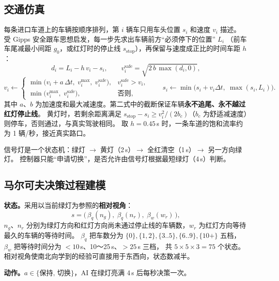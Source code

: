 \documentclass[UTF8,a4paper,zihao=-4,fontset=none]{ctexart}
\begin{document}
\subsection{交通仿真}
每条进口车道上的车辆按顺序排列，第 $i$ 辆车只用车头位置 $s_i$ 和速度 $v_i$ 描述。
受 Gipps 安全跟车思想\cite{gipps1981}启发，每一步先求出车辆前方“必须停下的位置” $L_i$
（前车车尾减最小间距 $g_0$，或红灯时的停止线 $s_{\text{stop}}$），再保留与速度成正比的时间车距 $h$：
\begin{equation}
  d_i = L_i - h\,v_i - s_i,\qquad
  v_i^{\text{safe}} = \sqrt{2\,b\,\max(d_i,0)},
\end{equation}
\begin{equation}
  v_i \leftarrow
  \begin{cases}
    \min\!\big(v_i + a\,\Delta t,\; v_i^{\max},\; v_i^{\text{safe}}\big), & v_i^{\text{safe}} > v_i,\\
    \min\!\big(v_i^{\max},\; v_i^{\text{safe}}\big), & \text{否则},
  \end{cases}
  \qquad s_i \leftarrow \min\!\big(s_i + v_i\Delta t,\; \max(s_i, L_i)\big).
\end{equation}
其中 $a$、$b$ 为加速度和最大减速度。第二式中的截断保证车辆\textbf{永不追尾、永不越过红灯停止线}。
黄灯时，若剩余距离满足 $s_{\text{stop}}-s_i \ge v_i^2/(2b_c)$（$b_c$ 为舒适减速度）则停车，否则通过，与真实驾驶相同。
取 $h=0.45$\,s 时，一条车道的饱和流率约为 1 辆/秒，接近真实路口。

信号灯是一个状态机：绿灯 $\to$ 黄灯（2\,s）$\to$ 全红清空（1\,s）$\to$ 另一方向绿灯。
控制器只能“申请切换”，是否允许由信号灯根据最短绿灯（4\,s）判断。

\subsection{马尔可夫决策过程建模}
\textbf{状态。}采用以当前绿灯为参照的\textbf{相对视角}：
\begin{equation}
  s = \big(\,\beta_q(n_g),\; \beta_q(n_r),\; \beta_w(w_r)\,\big),
\end{equation}
$n_g$、$n_r$ 分别为绿灯方向和红灯方向尚未通过停止线的车辆数，$w_r$ 为红灯方向等待最久的车辆的等待时间。
$\beta_q$ 把车数分为 $\{0\},\{1,2\},\{3..5\},\{6..9\},\{10+\}$ 五档，$\beta_w$ 把等待时间分为 $<10$\,s、10～25\,s、$>25$\,s 三档，
共 $5\times5\times3=75$ 个状态。相对视角使南北向学到的经验可直接用于东西向，状态数减半。

\textbf{动作。}$a\in\{\text{保持},\,\text{切换}\}$，AI 在绿灯亮满 4\,s 后每秒决策一次。
\end{document}
